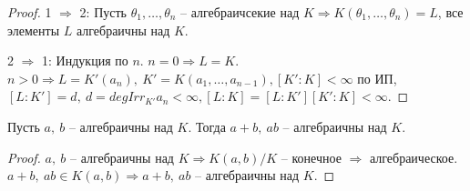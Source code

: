 \documentclass[main]{subfiles}
\begin{document}
\begin{proof}
    1 $\Rightarrow$ 2: Пусть $\theta_1, \ldots, \theta_n$ -- алгебраичсекие над $K \Rightarrow
    K(\theta_1, \ldots, \theta_n) = L$, все элементы $L$ алгебраичны над $K$.

    2 $\Rightarrow$ 1: Индукция по $n$. $n = 0 \Rightarrow L = K$.
    $n > 0 \Rightarrow L = K'(a_n), \ K' = K(a_1, \ldots, a_{n-1}),
    [K':K] < \infty$ по ИП, $[L:K'] = d, \ d = deg Irr_{K'}a_n < \infty, 
    [L:K] = [L:K'][K':K] < \infty$.
\end{proof}

\begin{corollary}
    Пусть $a, \ b$  -- алгебраичны над $K$. Тогда $a + b, \ ab$ -- алгебраичны над $K$. 
\end{corollary}
    
\begin{proof}
    $a, \ b$  -- алгебраичны над $K \Rightarrow K(a, b)/K$ -- конечное $\Rightarrow$ алгебраическое.
    $a+b, \ ab \in K(a, b) \Rightarrow a+b, \ ab$ -- алгебраичны над $K$.
\end{proof}
\end{document}
